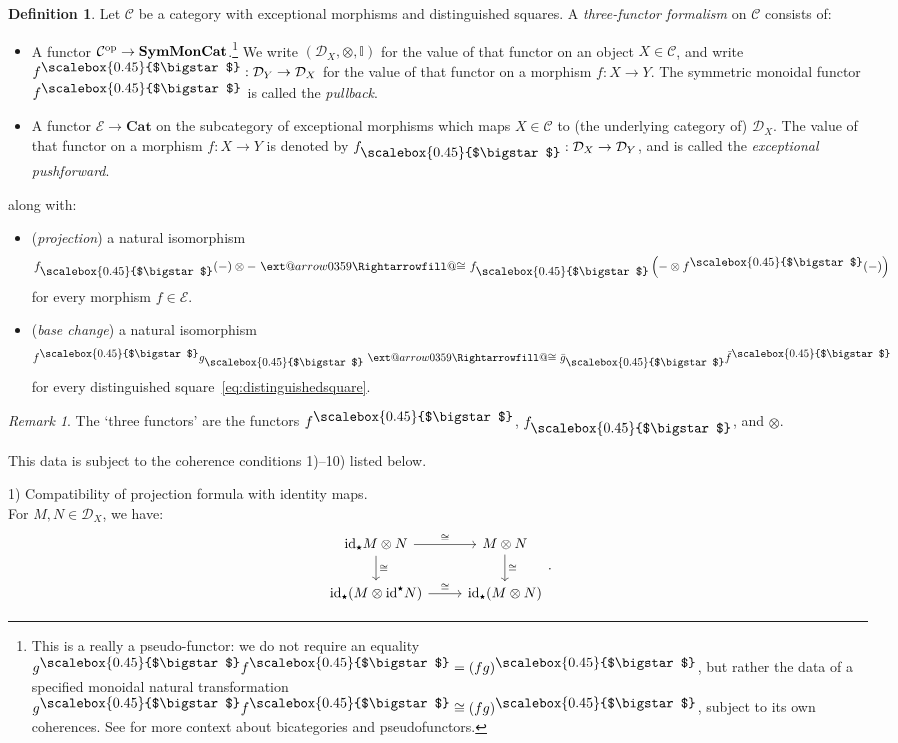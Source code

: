 \documentclass[10pt,a4paper,oneside]{amsart}
\makeatletter
\theoremstyle{remark}
\newtheorem{remark}[theorem]{Remark}
\theoremstyle{definition}
\newtheorem{definition}[theorem]{Definition}
\newcommand{\tn}[1]{\textnormal{#1}}
\newcommand{\rar}{\rightarrow}
\newcommand{\id}{\textnormal{id}}
\newcommand{\smsq}{{\mathbin{\vcenter{\hbox{\scalebox{0.45}{$\bigstar$}}}}}}
\newcommand{\pull}[1]{#1^\smsq}
\newcommand{\push}[1]{#1_\smsq}
\newcommand{\xRightarrow}[2][]{\ext@arrow 0359\Rightarrowfill@{#1}{#2}}
\makeatother
\begin{document}
\begin{definition}\label{def:threeffdata}
Let $\mathcal C$ be a category with exceptional morphisms and distinguished squares.
A \emph{three-functor formalism} on $\mathcal C$ consists of:
	\begin{itemize} [wide=10pt, leftmargin=5mm]
		\item A functor $\mathcal{C}^\tn{op}\rar \mathbf{SymMonCat}$.\footnote{This is a really a pseudo-functor: we do not require an equality $\pull{g} \pull{f}= (fg)^\smsq$, but rather the data of a specified monoidal natural transformation $\pull{g} \pull{f}\cong (fg)^\smsq$, subject to its own coherences. See \cite{JohnsonYau2021} for more context about bicategories and pseudofunctors.}
We write $(\mathcal{D}_X,\otimes, \mathbb{I})$ for the value of that functor on an object $X\in \mathcal{C}$, and write $\pull{f}:\mathcal{D}_Y\to \mathcal{D}_X$
for the value of that functor on a morphism $f:X\to Y$. The symmetric monoidal functor $\pull{f}$ is called the \emph{pullback}.\medskip   
		\item A functor $\mathcal{E} \rar \mathbf{Cat}$ on the subcategory of exceptional morphisms which maps $X\in \mathcal{C}$ to (the underlying category of) $\mathcal{D}_X$. The value of that functor on a morphism $f:X\to Y$ is denoted by $\push{f}:\mathcal D_X\to \mathcal D_Y$, and is called the \emph{exceptional pushforward}.\medskip
	\end{itemize}
along with:
	\begin{itemize}[wide=10pt, leftmargin=5mm]
		\item (\emph{projection}) a natural isomorphism $$\push{f}(-)\otimes - \,\,\xRightarrow{\cong}\,\, \push{f}\left(- \otimes \pull{f}(-)\right)$$ for every morphism $f\in \mathcal E$.\medskip
		\item (\emph{base change}) a natural isomorphism $$\pull{f} \push{g} \,\,\xRightarrow{\cong}\,\, \push{\bar{g}}\pull{\bar{f}}$$ for every distinguished square~\eqref{eq:distinguishedsquare}.
	\end{itemize}

\begin{remark}
	The `three functors' are the functors $\pull{f}$, $\push{f}$, and $\otimes$.
\end{remark}

\noindent
This data is subject to the coherence conditions 1)--10) listed below. \medskip

1) Compatibility of projection formula with identity maps.\\
For $M,N\in \mathcal D_X$, we have:
\[
\begin{tikzcd}
    \push{\id}M\otimes N \arrow[r,"\cong"]\arrow[d,"\cong"] & M \otimes N\arrow[d,"\cong"]\\
    \push{\id}(M \otimes \pull{\id}N) \arrow[r,"\cong"]& \push{\id}(M\otimes N)
\end{tikzcd}.
\]


\end{definition}
\end{document}
